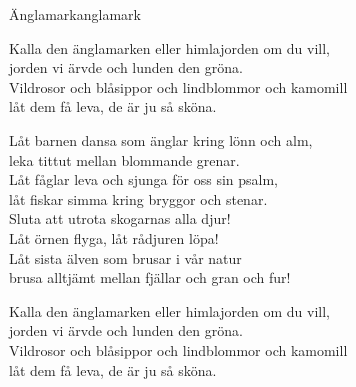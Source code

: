 \begin{song}{Änglamark}{anglamark}
\begin{vers}
Kalla den änglamarken eller himlajorden om du vill,\\
jorden vi ärvde och lunden den gröna.\\
Vildrosor och blåsippor och lindblommor och kamomill\\
låt dem få leva, de är ju så sköna.\\
\end{vers}
\begin{vers}
Låt barnen dansa som änglar kring lönn och alm,\\
leka tittut mellan blommande grenar.\\
Låt fåglar leva och sjunga för oss sin psalm,\\
låt fiskar simma kring bryggor och stenar.\\
Sluta att utrota skogarnas alla djur!\\
Låt örnen flyga, låt rådjuren löpa!\\
Låt sista älven som brusar i vår natur\\
brusa alltjämt mellan fjällar och gran och fur!\\
\end{vers}
\begin{vers}
Kalla den änglamarken eller himlajorden om du vill,\\
jorden vi ärvde och lunden den gröna.\\
Vildrosor och blåsippor och lindblommor och kamomill\\
låt dem få leva, de är ju så sköna.\\
\end{vers}
\end{song}
